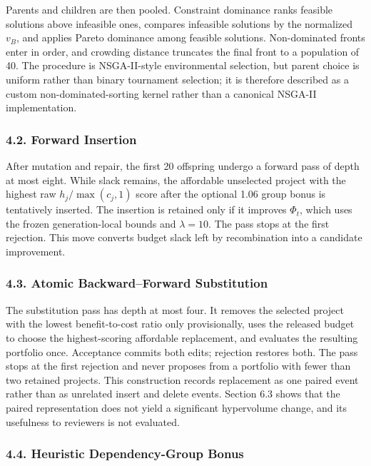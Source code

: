 \documentclass[
]{article}
\begin{document}
Parents and children are then pooled. Constraint dominance ranks feasible solutions above infeasible ones, compares infeasible solutions by the normalized \(v_B\), and applies Pareto dominance among feasible solutions. Non-dominated fronts enter in order, and crowding distance truncates the final front to a population of 40. The procedure is NSGA-II-style environmental selection, but parent choice is uniform rather than binary tournament selection; it is therefore described as a custom non-dominated-sorting kernel rather than a canonical NSGA-II implementation.

\subsubsection{4.2. Forward Insertion}\label{forward-insertion}

After mutation and repair, the first 20 offspring undergo a forward pass of depth at most eight. While slack remains, the affordable unselected project with the highest raw \(h_j/\max(c_j,1)\) score after the optional 1.06 group bonus is tentatively inserted. The insertion is retained only if it improves \(\Phi_t\), which uses the frozen generation-local bounds and \(\lambda=10\). The pass stops at the first rejection. This move converts budget slack left by recombination into a candidate improvement.

\subsubsection{4.3. Atomic Backward--Forward Substitution}\label{atomic-backwardforward-substitution}

The substitution pass has depth at most four. It removes the selected project with the lowest benefit-to-cost ratio only provisionally, uses the released budget to choose the highest-scoring affordable replacement, and evaluates the resulting portfolio once. Acceptance commits both edits; rejection restores both. The pass stops at the first rejection and never proposes from a portfolio with fewer than two retained projects. This construction records replacement as one paired event rather than as unrelated insert and delete events. Section 6.3 shows that the paired representation does not yield a significant hypervolume change, and its usefulness to reviewers is not evaluated.

\subsubsection{4.4. Heuristic Dependency-Group Bonus}\label{heuristic-dependency-group-bonus}
\end{document}
